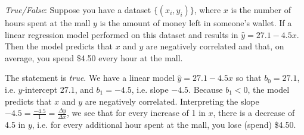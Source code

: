 \documentclass[11pt,letterpaper]{article}
\begin{document}
\quizsol \textit{True/False}: Suppose you have a dataset $\{ (x_i, y_i ) \}$, where $x$ is the number of hours spent at the mall $y$ is the amount of money left in someone's wallet. If a linear regression model performed on this dataset and results in $\widehat{y}= 27.1 - 4.5x$. Then the model predicts that $x$ and $y$ are negatively correlated and that, on average, you spend \$4.50 every hour at the mall. \pspace

\sol The statement is \textit{true}. We have a linear model $\widehat{y}= 27.1 - 4.5x$ so that $b_0= 27.1$, i.e. $y$-intercept $27.1$, and $b_1= -4.5$, i.e. slope $-4.5$. Because $b_1 < 0$, the model predicts that $x$ and $y$ are negatively correlated. Interpreting the slope $-4.5= \frac{-4.5}{1}= \frac{\Delta y}{\Delta x}$, we see that for every increase of 1 in $x$, there is a decrease of 4.5 in $y$, i.e. for every additional hour spent at the mall, you lose (spend) \$4.50. \pvspace{1.5cm}






\end{document}
